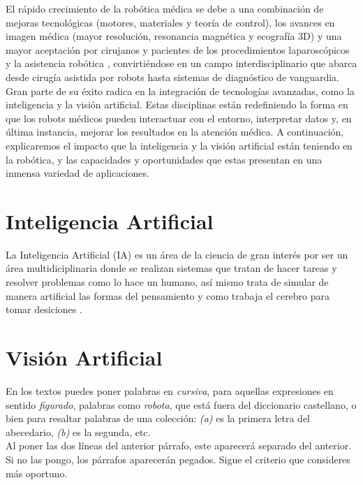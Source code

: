 El rápido crecimiento de la robótica médica se debe a una combinación de mejoras tecnológicas (motores, materiales y teoría de control), los avances en imagen médica (mayor resolución, resonancia magnética y ecografía 3D) y una mayor aceptación por cirujanos y pacientes de los procedimientos laparoscópicos y la asistencia robótica \cite{Beasley12}, convirtiéndose en un campo interdisciplinario que abarca desde cirugía asistida por robots hasta sistemas de diagnóstico de vanguardia. Gran parte de su éxito radica en la integración de tecnologías avanzadas, como la inteligencia y la visión artificial. Estas disciplinas están redefiniendo la forma en que los robots médicos pueden interactuar con el entorno, interpretar datos y, en última instancia, mejorar los resultados en la atención médica. A continuación, explicaremos el impacto que la inteligencia y la visión artificial están teniendo en la robótica, y las capacidades y oportunidades que estas presentan en una inmensa variedad de aplicaciones.

\pagebreak

\section{Inteligencia Artificial}
\label{sec:IA} 

La Inteligencia Artificial (IA) es un área de la ciencia de gran interés por ser un área multidiciplinaria donde se realizan sistemas que tratan de hacer tareas y resolver problemas como lo hace un humano, así mismo trata de simular de manera artificial las formas del pensamiento y como trabaja el cerebro para tomar desiciones \cite{Ponce14}.\\



\section{Visión Artificial}
\label{sec:VA} 



En los textos puedes poner palabras en \textit{cursiva}, para aquellas expresiones en sentido \textit{figurado}, palabras como \textit{robota}, que está fuera del diccionario castellano, o bien para resaltar palabras de una colección: \textit{(a)} es la primera letra del abecedario, \textit{(b)} es la segunda, etc.\\

Al poner las dos líneas del anterior párrafo, este aparecerá separado del anterior. Si no las pongo, los párrafos aparecerán pegados. Sigue el criterio que consideres más oportuno.


